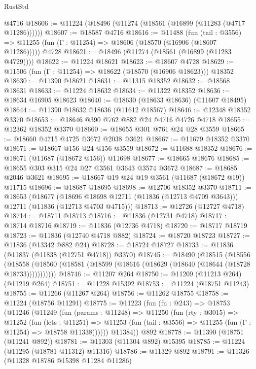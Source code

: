 \begin{lexlean}{RustStd}
\begin{coremodule}
    @4716
@18606 := @11224 (@18496 (@11274 (@18561 (@16899 (@11283 (@4717 @11286))))))
@18607 := @18587 @4716
@18616 := @11488
    (fun (tail : @3556) => @11255 (fun (Γ : @11254) => @18606 (@18570 (@16906 (@18607 @11286)))))
    @4728
@18621 := @18496 (@11274 (@18561 (@16899 (@11283 @4729))))
@18622 := @11224 @18621
@18623 := @18607 @4728
@18629 := @11506 (fun (Γ : @11254) => @18622 (@18570 (@16906 @18623))) @18352
@18630 := @11390 @18621
@18631 := @11315 @18352
@18632 := @18568 @18631
@18633 := @11224 @18632
@18634 := @11322 @18352
@18636 := @18634 @16905 @18623
@18640 := @18630 (@18633 @18636) (@11607 @18495)
@18644 := @11390 @18632 @18636 (@11612 @18567)
@18646 := @12348 @18352 @3370
@18653 := @18646 @390 @762 @882 @24 @4716 @4726 @4718
@18655 := @12362 @18352 @3370
@18660 := @18655 @301 @761 @24 @28 @3559
@18665 := @18660 @4715 @4725 @3672 @2038 @3621
@18667 := @11679 @18352 @3370
@18671 := @18667 @156 @24 @156 @3559
@18672 := @11688 @18352
@18676 := @18671 (@11687 (@18672 @156)) @11698
@18677 := @18665 @18676
@18685 := @18655 @303 @315 @24 @27 @3561 @3643 @3574 @3672
@18687 := @18685 @2046 @3621
@18695 := @18667 @19 @24 @19 @3561 (@11687 (@18672 @19)) @11715
@18696 := @18687 @18695
@18698 := @12706 @18352 @3370
@18711 := @18653
    (@18677
      (@18696 @18698 @12711 (@11836 (@12713 @4709 @3643)))
      @12711
      (@11836 (@12713 @4703 @4715)))
@18713 := @12726 (@12727 @4718)
@18714 := @18711 @18713
@18716 := @11836 (@12731 @4718)
@18717 := @18714 @18716
@18719 := @11836 (@12736 @4718)
@18720 := @18717 @18719
@18723 := @11836 (@12740 @4718 @882)
@18724 := @18720 @18723
@18727 := @11836 (@13342 @882 @24)
@18728 := @18724 @18727
@18733 := @11836 (@11837 (@11838 (@12751 @4718)) @3370)
@18745 := @18490
    (@18515
      (@18556
        (@18558 (@18560 (@18581 (@18599 (@18616 (@18629 (@18640 (@18644 (@18728 @18733)))))))))))
@18746 := @11207 @264
@18750 := @11209 (@11213 @264) (@11219 @264)
@18751 := @11228 @15392
@18753 := @11224 (@18751 @11243)
@18755 := @11266 (@11267 @264)
@18756 := @11262 @18755
@18758 := @11224 (@18756 @11291)
@18775 := @11223
    (fun (fn : @243) =>
    @18753
      (@11246
        (@11249
          (fun (params : @11248) =>
          @11250
            (fun (rty : @3015) =>
            @11252
              (fun (lets : @11251) =>
              @11253 (fun (tail : @3556) => @11255 (fun (Γ : @11254) => @18758 @11338))))))
        @11384))
    @892
@18778 := @11390 (@18751 (@11241 @892))
@18781 := @11303 (@11304 @892) @15395
@18785 := @11224 (@11295 (@18781 @11312) @11316)
@18786 := @11329 @892
@18791 := @11326 (@11328 @18786 @15398 @11284 @11286)

\end{coremodule}
\end{lexlean}
